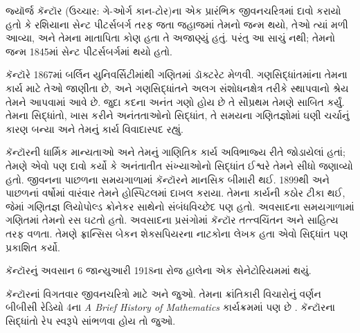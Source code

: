 \documentclass[../../../include/open-logic-section]{subfiles}
\begin{document}



જ્યૉર્જ કૅન્ટૉર (ઉચ્ચાર: ગે-ઓર્ગ કાન-ટોર)ના
એક પ્રારંભિક જીવનચરિત્રમાં
દાવો કરાયો હતો કે રશિયાના સેન્ટ પીટર્સબર્ગ તરફ
જતા જહાજમાં તેમનો જન્મ થયો, તેઓ ત્યાં મળી આવ્યા,
અને તેમના માતાપિતા કોણ હતા તે અજાણ્યું હતું.
પરંતુ આ સાચું નથી; તેમનો જન્મ 1845માં સેન્ટ
પીટર્સબર્ગમાં થયો હતો.

કૅન્ટૉરે 1867માં બર્લિન યુનિવર્સિટીમાંથી
ગણિતમાં ડૉક્ટરેટ મેળવી. ગણસિદ્ધાંતમાંના તેમના
કાર્ય માટે તેઓ જાણીતા છે, અને ગણસિદ્ધાંતને
અલગ સંશોધનક્ષેત્ર તરીકે સ્થાપવાનો શ્રેય તેમને
આપવામાં આવે છે. જુદા કદના અનંત ગણો હોય છે
તે સૌપ્રથમ તેમણે સાબિત કર્યું. તેમના સિદ્ધાંતો,
ખાસ કરીને અનંતતાઓનો સિદ્ધાંત, તે સમયના
ગણિતજ્ઞોમાં ઘણી ચર્ચાનું કારણ બન્યા અને તેમનું
કાર્ય વિવાદાસ્પદ રહ્યું.

કૅન્ટૉરની ધાર્મિક માન્યતાઓ અને તેમનું ગાણિતિક
કાર્ય અવિભાજ્ય રીતે જોડાયેલાં હતાં; તેમણે
એવો પણ દાવો કર્યો કે અનંતાતીત સંખ્યાઓનો
સિદ્ધાંત ઈશ્વરે તેમને સીધો જણાવ્યો હતો.
જીવનના પાછળના સમયગાળામાં કૅન્ટૉરને માનસિક
બીમારી થઈ. 1899થી અને પાછળનાં વર્ષોમાં વારંવાર
તેમને હોસ્પિટલમાં દાખલ કરાયા. તેમના કાર્યની
કઠોર ટીકા થઈ, જેમાં ગણિતજ્ઞ લિયોપોલ્ડ ક્રોનેકર
સાથેનો સંબંધવિચ્છેદ પણ હતો. અવસાદના સમયગાળામાં
ગણિતમાં તેમનો રસ ઘટતો હતો.
અવસાદના પ્રસંગોમાં કૅન્ટૉર તત્ત્વચિંતન અને
સાહિત્ય તરફ વળતા. તેમણે ફ્રાન્સિસ બેકન
શેક્સપિયરના નાટકોના લેખક હતા એવો સિદ્ધાંત
પણ પ્રકાશિત કર્યો.

કૅન્ટૉરનું અવસાન 6 જાન્યુઆરી 1918ના રોજ
હાલેના એક સેનેટોરિયમમાં થયું.


\begin{reading}
કૅન્ટૉરનાં વિગતવાર જીવનચરિત્રો માટે
\citet{Dauben1990} અને
\citet{Grattan-Guinness1971} જુઓ. તેમના
ક્રાંતિકારી વિચારોનું વર્ણન બીબીસી રેડિયો 4ના
\emph{A Brief History of
  Mathematics} કાર્યક્રમમાં પણ છે
\citep{Sautoy2014}. કૅન્ટૉરના સિદ્ધાંતો
રેપ સ્વરૂપે સાંભળવા હોય તો \citet{Rose2012} જુઓ.
\end{reading}
\end{document}
